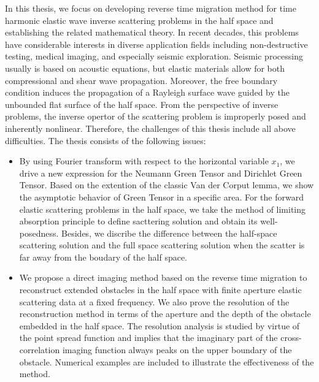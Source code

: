 In this thesis, we focus on developing reverse time migration method for time harmonic elastic wave inverse scattering problems in the half space and establishing the related mathematical theory. In recent decades, this problems have considerable interests in diverse application fields including non-destructive testing, medical imaging, and especially seismic exploration.
Seismic processing
 usually is based on acoustic equations, but elastic materials allow for both compressional and shear wave propagation. Moreover, the free boundary condition induces the propagation of a Rayleigh surface wave guided by the unbounded flat surface of the half space. From the perspective of inverse problems, the inverse opertor of the scattering problem is improperly posed and inherently nonlinear. Therefore, the challenges of this thesis include all above difficulties. The thesis consists of the following issues:
\begin{itemize}
	\item By using Fourier transform with respect to the horizontal variable $x_1$, we drive a new expression for the Neumann Green Tensor and Dirichlet Green Tensor. Based on the extention of the classic Van der Corput lemma, we show the asymptotic behavior of Green Tensor in a specific area. For the forward elastic scattering problems in the half space, we take the method of limiting absorption principle to define  sacttering solution and obtain its well-posedness. Besides, we discribe the difference between the half-space scattering solution and the full space scattering solution  when the scatter is far away from the boudary of the half space.
	
	
	\item We propose a direct imaging method based on the reverse time migration to reconstruct extended
	obstacles in the half space with finite aperture elastic scattering data at a fixed
	frequency. We also prove the resolution of the reconstruction method in terms of the
	aperture and the depth of the obstacle embedded in the half space. The resolution
	analysis is studied by virtue of the point spread function and implies that the imaginary 
	part of the cross-correlation imaging function
	always peaks on the upper boundary of the obstacle. Numerical examples
	are included to illustrate the effectiveness of the method. 
\end{itemize}

